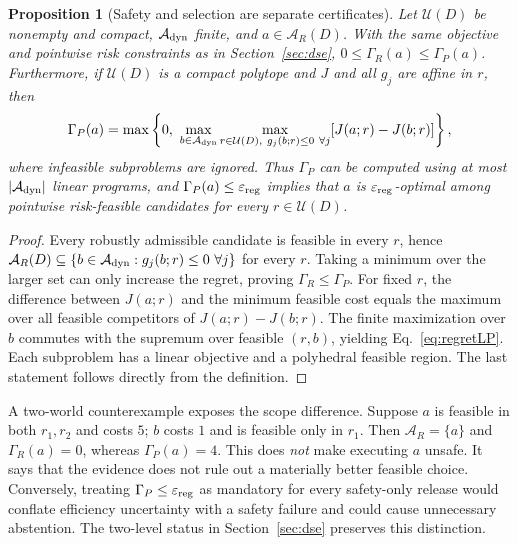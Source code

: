 \documentclass[10pt]{article}
\newtheorem{proposition}{Proposition}\newtheorem{assumption}{Assumption}\newtheorem{remark}{Remark}
\begin{document}
\begin{proposition}[Safety and selection are separate certificates]\label{prop:regret}
Let $\mathcal U(D)$ be nonempty and compact, $\mathcal A_{\rm dyn}$ finite, and $a\in\mathcal A_R(D)$. With the same objective and pointwise risk constraints as in Section~\ref{sec:dse}, $0\le\Gamma_R(a)\le\Gamma_P(a)$. Furthermore, if $\mathcal U(D)$ is a compact polytope and $J$ and all $g_j$ are affine in $r$, then
\begin{equation}
 \Gamma_P(a)=\max\left\{0,\ \max_{b\in\mathcal A_{\rm dyn}}
 \underset{r\in\mathcal U(D),\ g_j(b;r)\le0\ \forall j}{\operatorname{max}}
 [J(a;r)-J(b;r)]\right\},
 \label{eq:regretLP}
\end{equation}
where infeasible subproblems are ignored. Thus $\Gamma_P$ can be computed using at most $|\mathcal A_{\rm dyn}|$ linear programs, and $\Gamma_P(a)\le\varepsilon_{\rm reg}$ implies that $a$ is $\varepsilon_{\rm reg}$-optimal among pointwise risk-feasible candidates for \emph{every} $r\in\mathcal U(D)$.
\end{proposition}
\begin{proof}
Every robustly admissible candidate is feasible in every $r$, hence $\mathcal A_R(D)\subseteq\{b\in\mathcal A_{\rm dyn}:g_j(b;r)\le0\ \forall j\}$ for every $r$. Taking a minimum over the larger set can only increase the regret, proving $\Gamma_R\le\Gamma_P$. For fixed $r$, the difference between $J(a;r)$ and the minimum feasible cost equals the maximum over all feasible competitors of $J(a;r)-J(b;r)$. The finite maximization over $b$ commutes with the supremum over feasible $(r,b)$, yielding Eq.~\eqref{eq:regretLP}. Each subproblem has a linear objective and a polyhedral feasible region. The last statement follows directly from the definition.
\end{proof}
A two-world counterexample exposes the scope difference. Suppose $a$ is feasible in both $r_1,r_2$ and costs $5$; $b$ costs $1$ and is feasible only in $r_1$. Then $\mathcal A_R=\{a\}$ and $\Gamma_R(a)=0$, whereas $\Gamma_P(a)=4$. This does \emph{not} make executing $a$ unsafe. It says that the evidence does not rule out a materially better feasible choice. Conversely, treating $\Gamma_P\le\varepsilon_{\rm reg}$ as mandatory for every safety-only release would conflate efficiency uncertainty with a safety failure and could cause unnecessary abstention. The two-level status in Section~\ref{sec:dse} preserves this distinction.
\end{document}

